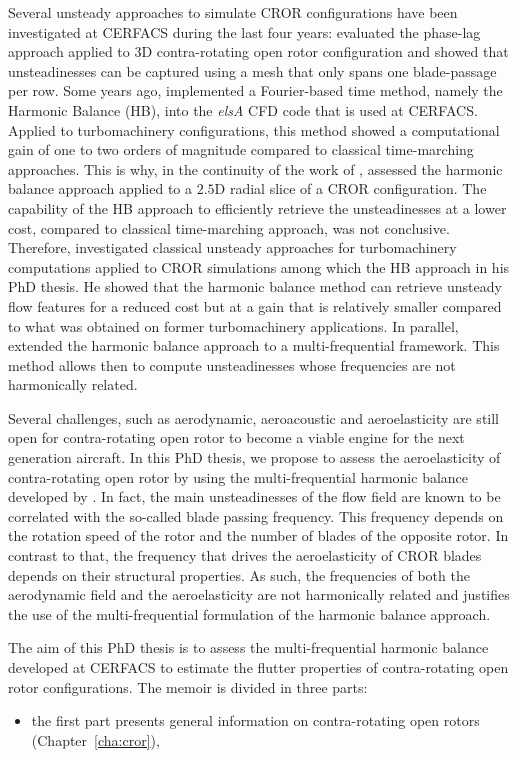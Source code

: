 Several unsteady approaches to simulate CROR configurations
have been investigated at CERFACS during the
last four years: \citet{Burnazzi2010} evaluated the phase-lag approach
applied to 3D contra-rotating open rotor configuration and showed
that unsteadinesses can be captured using a mesh that only spans one
blade-passage per row. 
Some years ago, \citet{ThesisSicot} implemented a 
Fourier-based time method, namely the Harmonic Balance (HB),
into the \emph{elsA} CFD code that is used at CERFACS. Applied to turbomachinery
configurations, this method showed a computational gain
of one to two orders of magnitude 
compared to classical time-marching approaches.
This is why, in the continuity of the work
of \citet{Burnazzi2010}, \citet{Yabili2010} assessed 
the harmonic balance approach applied to 
a $2.5$D radial slice of a CROR configuration. 
The capability
of the HB approach to efficiently retrieve the unsteadinesses
at a lower cost, compared to classical time-marching approach,
 was not conclusive.
Therefore, \citet{ThesisFrancois}
investigated classical unsteady approaches for
turbomachinery computations applied to CROR simulations
among which the HB approach in his PhD thesis. 
He showed that
the harmonic balance method can retrieve unsteady
flow features for a reduced cost but at a gain that
is relatively smaller compared to what was
obtained on former turbomachinery applications. 
In parallel, \citet{ThesisGuedeney} extended the harmonic
balance approach to a multi-frequential framework. 
This method allows then to compute unsteadinesses whose frequencies
are not harmonically related.

Several challenges, such as aerodynamic,
aeroacoustic and aeroelasticity are still open 
for contra-rotating open rotor
to become a viable engine for the next generation aircraft.
In this PhD thesis, we propose to assess the aeroelasticity of 
contra-rotating open rotor by using the multi-frequential
harmonic balance developed by \citet{ThesisGuedeney}.
In fact, the main unsteadinesses of the flow field
are known to be correlated with the so-called
blade passing frequency. This frequency depends on the
rotation speed of the rotor and the number of blades
of the opposite rotor. In contrast to that, the 
frequency that drives the aeroelasticity of CROR
blades depends on their structural properties.
As such, the frequencies of both the aerodynamic
field and the aeroelasticity are not harmonically
related and justifies the use of the multi-frequential
formulation of the harmonic balance approach.


The aim of this PhD thesis is to assess the
multi-frequential harmonic balance developed at CERFACS
to estimate the flutter properties of contra-rotating open rotor
configurations. The memoir is divided in three parts:
\begin{itemize}
	\item the first part presents general information on 
	contra-rotating open rotors (Chapter~\ref{cha:cror}),
	
\end{itemize}